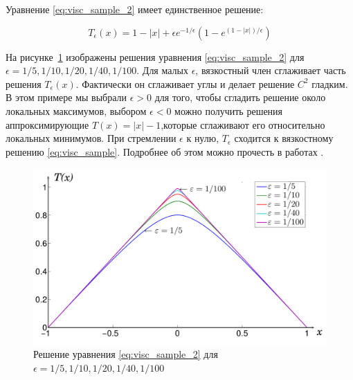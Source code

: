 Уравнение \eqref{eq:visc_sample_2} имеет единственное решение:

\begin{equation*}
  T_\epsilon(x) = 1 - |x| + \epsilon e^{-1/\epsilon}(1 - e^{(1-|x|)/\epsilon})
\end{equation*}


На рисунке~\ref{fig:viscosity-experiment} изображены решения уравнения
\eqref{eq:visc_sample_2} для  $\epsilon =
1/5,1/10,1/20,1/40,1/100$. Для малых $\epsilon$, вязкостный член
сглаживает часть решения $T_\epsilon(x)$. Фактически он сглаживает
углы и делает решение $C^2$ гладким. В этом примере мы выбрали
$\epsilon >0$ для того, чтобы сгладить решение около локальных максимумов, выбором
$\epsilon <0$ можно получить решения аппроксимирующие $T(x) = |x| -
1$,которые сглаживают его относительно локальных минимумов. При
стремлении $\epsilon$ к нулю, $T_\epsilon$ сходится к вязкостному
решению \eqref{eq:visc_sample}. Подробнее об этом можно прочесть в
работах \cite{V1984,V1983}.


\begin{figure}[h]
  \centering
  \includegraphics[width=0.6\linewidth]{img/viscosity_example.png}
  \hfil \caption{Решение уравнения \eqref{eq:visc_sample_2} для $\epsilon = 1/5, 1/10, 1/20, 1/40, 1/100$}
  \label{fig:viscosity-experiment}

\end{figure}





